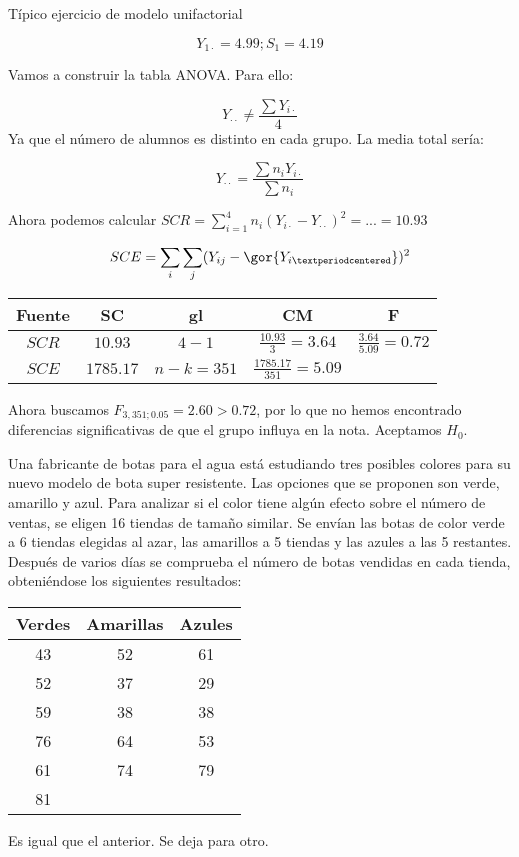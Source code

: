 \begin{problem}[16]

Típico ejercicio de modelo unifactorial

\solution

\[Y_{1·} = 4.99; S_1 = 4.19\]

Vamos a construir la tabla ANOVA. Para ello:

\[Y_{··} ≠ \frac{\sum Y_{i·}}{4}\]
Ya que el número de alumnos es distinto en cada grupo. La media total sería:

\[Y_{··} = \frac{\sum n_i Y_{i·}}{\sum n_i}\]

Ahora podemos calcular $SCR = \sum_{i=1}^4 n_i (Y_{i·} - Y_{··})^2 = ... = 10.93$

\[SCE = \sum_i \sum_j(Y_{ij}-\gor{Y_{i·}})^2\]
\begin{center}
\begin{tabular}{ccccc}
Fuente & SC & gl & CM&F\\\hline
$SCR$ & $10.93$ & $4-1$ & $\frac{10.93}{3} = 3.64$&$\frac{3.64}{5.09} = 0.72$\\
$SCE$ & $1785.17$ & $n-k = 351$ & $\frac{1785.17}{351} = 5.09$ & 
\end{tabular}
\end{center}

Ahora buscamos $F_{3,351;0.05} = 2.60 > 0.72$, por lo que no hemos encontrado diferencias significativas de que el grupo influya en la nota. Aceptamos $H_0$.

\end{problem}


\begin{problem}[17]
Una fabricante de botas para el agua está estudiando tres posibles colores para su nuevo modelo de bota super resistente. Las opciones que se proponen son verde, amarillo y azul. Para analizar si el color tiene algún efecto sobre el número de ventas, se eligen 16 tiendas de tamaño similar. Se envían las botas de color verde a 6 tiendas elegidas al azar, las amarillos a 5 tiendas y las azules a las 5 restantes. Después de varios días se comprueba el número de botas vendidas en cada tienda, obteniéndose los siguientes resultados:
\begin{center}
\begin{tabular}{ccc}
Verdes&Amarillas&Azules\\\hline
43&52&61\\
52&37&29\\
59&38&38\\
76&64&53\\
61&74&79\\
81&&
\end{tabular}
\end{center}

\solution
Es igual que el anterior. Se deja para otro.

\end{problem}


